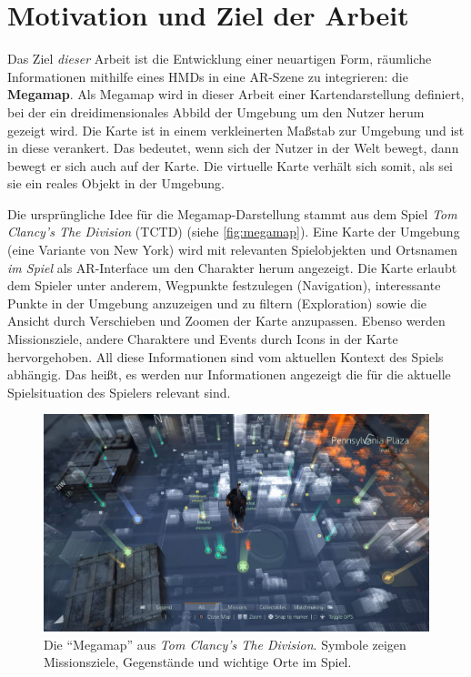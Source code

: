 \section{Motivation und Ziel der Arbeit}
\label{sec:motivation_ziel}
Das Ziel \emph{dieser} Arbeit ist die Entwicklung einer neuartigen Form, räumliche Informationen mithilfe eines HMDs in eine AR-Szene zu integrieren: die \textbf{Megamap}.
Als Megamap wird in dieser Arbeit einer Kartendarstellung definiert, bei der ein dreidimensionales Abbild der Umgebung um den Nutzer herum gezeigt wird.
Die Karte ist in einem verkleinerten Maßstab zur Umgebung und ist in diese verankert.
Das bedeutet, wenn sich der Nutzer in der Welt bewegt, dann bewegt er sich auch auf der Karte.
Die virtuelle Karte verhält sich somit, als sei sie ein reales Objekt in der Umgebung.

Die ursprüngliche Idee für die Megamap-Darstellung stammt aus dem Spiel \emph{Tom Clancy's The Division} (TCTD) \parencite{Ubisoft2018} (siehe \autoref{fig:megamap}).
Eine Karte der Umgebung (eine Variante von New York) wird mit relevanten Spielobjekten und Ortsnamen \emph{im Spiel} als AR-Interface um den Charakter herum angezeigt.
Die Karte erlaubt dem Spieler unter anderem, Wegpunkte festzulegen (Navigation), interessante Punkte in der Umgebung anzuzeigen und zu filtern (Exploration) sowie die Ansicht durch Verschieben und Zoomen der Karte anzupassen.
Ebenso werden Missionsziele, andere Charaktere und Events durch Icons in der Karte hervorgehoben.
All diese Informationen sind vom aktuellen Kontext des Spiels abhängig.
Das heißt, es werden nur Informationen angezeigt die für die aktuelle Spielsituation des Spielers relevant sind.
\begin{figure}[t]
    \centering
    \includegraphics[width=\textwidth]{figures/the_division_megamap.jpg}
    \caption{Die \enquote{Megamap} aus \emph{Tom Clancy's The Division}. Symbole zeigen Missionsziele, Gegenstände und wichtige Orte im Spiel. }
    \label{fig:megamap}
\end{figure}

